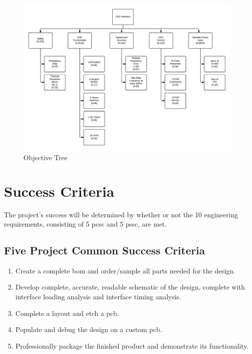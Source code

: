 \begin{figure}[H]
\centering
\includegraphics[width=1.0\textwidth]{otree.png}
\caption{Objective Tree}
\label{fig:o-tree}
\end{figure}

\section{Success Criteria}
The project's success will be determined by whether or not the 10 engineering requirements, consisting of 5 \gls{pcsc} and 5 \gls{pssc}, are met. 

\subsection{Five Project Common Success Criteria}
\begin{enumerate}
	\item Create a complete \gls{bom} and order/sample all parts needed for the design.
	\item Develop complete, accurate, readable schematic of the design, complete with interface loading analysis and interface timing analysis. 
	\item Complete a layout and etch a \gls{pcb}.
	\item Populate and debug the design on a custom \gls{pcb}.
	\item Professionally package the finished product and demonstrate its functionality.
\end{enumerate}

